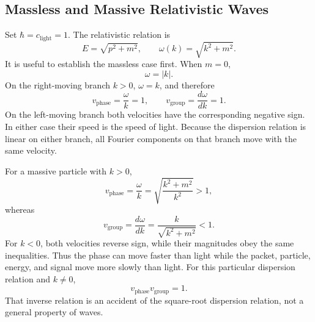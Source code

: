 \subsection{Massless and Massive Relativistic Waves}

\begin{classroomqa}
\end{classroomqa}

\begin{classroomqa}
\end{classroomqa}

Set \(\hbar=c_{\mathrm{light}}=1\). The relativistic relation is
\begin{equation}
E=\sqrt{p^2+m^2},
\qquad
\omega(k)=\sqrt{k^2+m^2}.
\end{equation}
It is useful to establish the massless case first. When \(m=0\),
\begin{equation}
\omega=|k|.
\end{equation}
On the right-moving branch \(k>0\), \(\omega=k\), and therefore
\begin{equation}
v_{\mathrm{phase}}=\frac{\omega}{k}=1,
\qquad
v_{\mathrm{group}}=\frac{d\omega}{dk}=1.
\end{equation}
On the left-moving branch both velocities have the corresponding negative sign. In either case their speed is the speed of light. Because the dispersion relation is linear on either branch, all Fourier components on that branch move with the same velocity.

For a massive particle with \(k>0\),
\begin{equation}
v_{\mathrm{phase}}
=\frac{\omega}{k}
=\sqrt{\frac{k^2+m^2}{k^2}}>1,
\end{equation}
whereas
\begin{equation}
v_{\mathrm{group}}
=\frac{d\omega}{dk}
=\frac{k}{\sqrt{k^2+m^2}}<1.
\end{equation}
For \(k<0\), both velocities reverse sign, while their magnitudes obey the same inequalities. Thus the phase can move faster than light while the packet, particle, energy, and signal move more slowly than light. For this particular dispersion relation and \(k\neq0\),
\begin{equation}
v_{\mathrm{phase}}v_{\mathrm{group}}=1.
\end{equation}
That inverse relation is an accident of the square-root dispersion relation, not a general property of waves.

